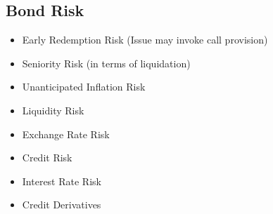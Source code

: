 \subsection{Bond Risk}

\begin{itemize}
\item Early Redemption Risk (Issue may invoke call provision)
\item Seniority Risk (in terms of liquidation)
\item Unanticipated Inflation Risk
\item Liquidity Risk
\item Exchange Rate Risk
\item Credit Risk
\item Interest Rate Risk
\item Credit Derivatives
\end{itemize}

